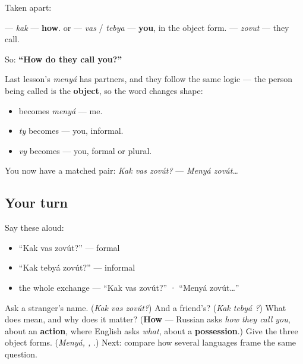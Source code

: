 Taken apart:

\textbf{} — \emph{kak} — \textbf{how}. \textbf{} or \textbf{} — \emph{vas} / \emph{tebya} — \textbf{you}, in the object form. \textbf{} — \emph{zovut} — they call.

So: \textbf{\textquotedblleft{}How do they call you?\textquotedblright{}}

\begin{grammarlens}[title={Grammar Lens: the object forms again}]
Last lesson's \emph{menyá} has partners, and they follow the same logic — the person being called is the \textbf{object}, so the word changes shape:

\begin{itemize}
\raggedright
  \item \textbf{} becomes \emph{menyá} — me.
  \item \emph{ty} becomes \textbf{} — you, informal.
  \item \emph{vy} becomes \textbf{} — you, formal or plural.
\end{itemize}

You now have a matched pair: \emph{Kak vas zovút?} — \emph{Menyá zovút…}
\end{grammarlens}

\subsection*{Your turn}
Say these aloud:

\begin{itemize}
\raggedright
  \item \textquotedblleft{}Kak vas zovút?\textquotedblright{} — formal
  \item \textquotedblleft{}Kak tebyá zovút?\textquotedblright{} — informal
  \item the whole exchange — \textquotedblleft{}Kak vas zovút?\textquotedblright{} · \textquotedblleft{}Menyá zovút…\textquotedblright{}
\end{itemize}

\begin{tcolorbox}[breakable,colback=teal!4,colframe=teal!35!black,title={Before you move on}]
Ask a stranger's name. (\emph{Kak vas zovút?}) And a friend's? (\emph{Kak tebyá ?}) What does \emph{} mean, and why does it matter? (\textbf{How} — Russian asks \emph{how they call you}, about an \textbf{action}, where English asks \emph{what}, about a \textbf{possession}.) Give the three object forms. (\emph{Menyá, , }.) Next: compare how several languages frame the same question.
\end{tcolorbox}
